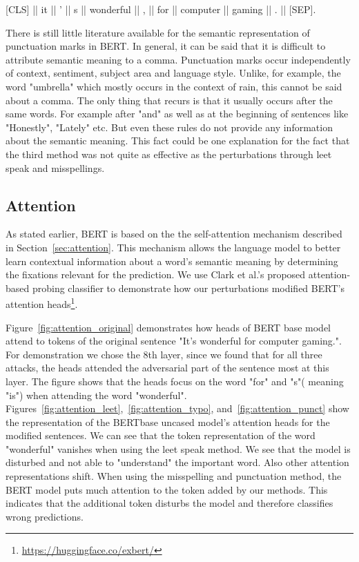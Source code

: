 {[}CLS{]}  ||  it  ||  '  ||  s  ||  wonderful  || , ||  for  ||  computer  ||  gaming  ||  .  ||  {[}SEP{]}.

There is still little literature available for the semantic representation of punctuation marks in BERT. In general, it can be said that it is difficult to attribute semantic meaning to a comma. Punctuation marks occur independently of context, sentiment, subject area and language style. Unlike, for example, the word "umbrella" which mostly occurs in the context of rain, this cannot be said about a comma. The only thing that recurs is that it usually occurs after the same words. For example after "and" as well as at the beginning of sentences like "Honestly", "Lately" etc. But even these rules do not provide any information about the semantic meaning. This fact could be one explanation for the fact that the third method was not quite as effective as the perturbations through leet speak and misspellings.


\subsection{Attention}
As stated earlier, BERT is based on the the self-attention mechanism described in Section~\ref{sec:attention}. This mechanism allows the language model to better learn contextual information about a word’s semantic meaning by determining the fixations relevant for the prediction. We use Clark et al.'s proposed attention-based probing classifier to demonstrate how our perturbations modified BERT's attention heads\footnote{\url{https://huggingface.co/exbert/}}\cite{clark2019does}. 

Figure~\ref{fig:attention_original} demonstrates how heads of BERT base model attend to tokens of the original sentence "It's wonderful for computer gaming.". For demonstration we chose the 8th layer, since we found that for all three attacks, the heads attended the adversarial part of the sentence most at this layer.
The figure shows that the heads focus on the word "for" and "s"( meaning "is") when attending the word "wonderful". 
Figures~\ref{fig:attention_leet},~\ref{fig:attention_typo}, and~\ref{fig:attention_punct} show the representation of the  BERTbase uncased model's attention heads for the modified sentences. We can see that the token representation of the word "wonderful" vanishes when using the leet speak method. We see that the model is disturbed and not able to "understand" the important word. Also other attention representations shift. When using the misspelling and punctuation method, the BERT model puts much attention to the token added by our methods. This indicates that the additional token disturbs the model and therefore classifies wrong predictions.


